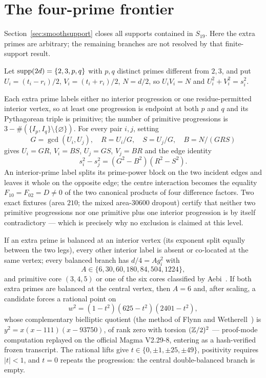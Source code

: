 \section{The four-prime frontier}\label{sec:frontier}

Section~\ref{sec:smoothsupport} closes all supports contained in $S_{19}$.
Here the extra primes are arbitrary; the remaining branches are not
resolved by that finite-support result.

Let $\operatorname{supp}(2d)=\{2,3,p,q\}$ with $p,q$ distinct primes different from
$2,3$, and put $U_i=(t_i-r_i)/2$, $V_i=(t_i+r_i)/2$, $N=d/2$, so
$U_iV_i=N$ and $U_i^2+V_i^2=s_i^2$.

\begin{proposition}\label{prop:fourprime}
Each extra prime labels either no interior progression or one
residue-permitted interior vertex, so at least one progression is endpoint
at both $p$ and $q$ and its Pythagorean triple is primitive; the number of
primitive progressions is $3-\#(\{I_p,I_q\}\setminus\{\varnothing\})$. For
every pair $i,j$, setting
\[
G=\gcd(U_i,U_j),\quad R=U_i/G,\quad S=U_j/G,\quad B=N/(GRS)
\]
gives $U_i=GR$, $V_i=BS$, $U_j=GS$, $V_j=BR$ and the edge identity
\[
s_i^2-s_j^2=(G^2-B^2)(R^2-S^2).
\]
An interior-prime label splits its prime-power block on the two incident
edges and leaves it whole on the opposite edge; the centre interaction
becomes the equality $F_{10}=F_{02}=D\neq0$ of the two canonical products
of four difference factors. Two exact fixtures (area $210$; the mixed
area-$30600$ dropout) certify that neither two primitive progressions nor
one primitive plus one interior progression is by itself contradictory ---
which is precisely why no exclusion is claimed at this level.
\end{proposition}

\begin{proposition}\label{prop:balanced}
If an extra prime is balanced at an interior vertex (its exponent split
equally between the two legs), every other interior label is absent or
co-located at the same vertex; every balanced branch has
$d/4=Ag_i^2$ with
\[
A\in\{6,30,60,180,84,504,1224\},
\]
and primitive core $(3,4,5)$ or one of the six cores classified by
Aebi~\cite{AEB26}. If both extra primes are balanced at the central vertex,
then $A=6$ and, after scaling, a candidate forces a rational point on
\[
w^2=(1-t^2)(625-t^2)(2401-t^2),
\]
whose complementary bielliptic quotient (the method of Flynn and
Wetherell~\cite{FW99}) is $y^2=x(x-111)(x-93750)$, of rank zero with
torsion $(\mathbb{Z}/2)^2$ --- proof-mode computation replayed on the official
Magma V2.29-8, entering as a hash-verified frozen transcript. The rational
lifts give $t\in\{0,\pm1,\pm25,\pm49\}$, positivity requires $|t|<1$, and
$t=0$ repeats the progression: the central double-balanced branch is empty.
\end{proposition}

